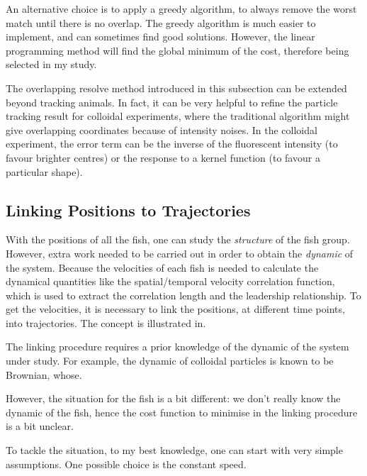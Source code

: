 \documentclass[11pt,twoside]{report}
\begin{document}
An alternative choice is to apply a greedy algorithm, to always remove the worst match until there is no overlap. The greedy algorithm is much easier to implement, and can sometimes find good solutions. However, the linear programming method will find the global minimum of the cost, therefore being selected in my study.

The overlapping resolve method introduced in this subsection can be extended beyond tracking animals. In fact, it can be very helpful to refine the particle tracking result for colloidal experiments, where the traditional algorithm might give overlapping coordinates because of intensity noises. In the colloidal experiment, the error term can be the inverse of the fluorescent intensity (to favour brighter centres) or the response to a kernel function (to favour a particular shape).

\subsection{Linking Positions to Trajectories}
\label{section:link}

With the positions of all the fish, one can study the \emph{structure} of the fish group. However, extra work needed to be carried out in order to obtain the \emph{dynamic} of the system. Because the velocities of each fish is needed to calculate the dynamical quantities like the spatial/temporal velocity correlation function, which is used to extract the correlation length and the leadership relationship. To get the velocities, it is necessary to link the positions, at different time points, into trajectories. The concept is illustrated in.


The linking procedure requires a prior knowledge of the dynamic of the system under study. For example, the dynamic of colloidal particles is known to be Brownian, whose.


However, the situation for the fish is a bit different: we don't really know the dynamic of the fish, hence the cost function to minimise in the linking procedure is a bit unclear.

To tackle the situation, to my best knowledge, one can start with very simple assumptions. One possible choice is the constant speed.

\end{document}
